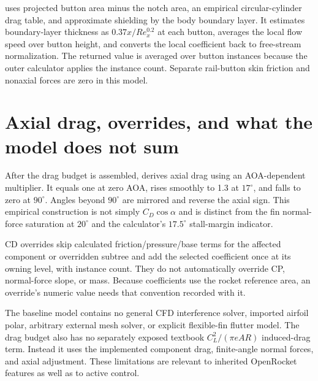  uses projected button area minus the notch area, an empirical circular-cylinder drag table, and approximate shielding by the body boundary layer. It estimates boundary-layer thickness as $0.37x/Re_x^{0.2}$ at each button, averages the local flow speed over button height, and converts the local coefficient back to free-stream normalization. The returned value is averaged over button instances because the outer calculator applies the instance count. Separate rail-button skin friction and nonaxial forces are zero in this model.


\section{Axial drag, overrides, and what the model does not sum}
After the drag budget is assembled,  derives axial drag using an AOA-dependent multiplier. It equals one at zero AOA, rises smoothly to 1.3 at $17^\circ$, and falls to zero at $90^\circ$. Angles beyond $90^\circ$ are mirrored and reverse the axial sign. This empirical construction is not simply $C_D\cos\alpha$ and is distinct from the fin normal-force saturation at $20^\circ$ and the calculator's $17.5^\circ$ stall-margin indicator.

CD overrides skip calculated friction/pressure/base terms for the affected component or overridden subtree and add the selected coefficient once at its owning level, with instance count. They do not automatically override CP, normal-force slope, or mass. Because coefficients use the rocket reference area, an override's numeric value needs that convention recorded with it.

The baseline model contains no general CFD interference solver, imported airfoil polar, arbitrary external mesh solver, or explicit flexible-fin flutter model. The drag budget also has no separately exposed textbook $C_L^2/(\pi eAR)$ induced-drag term. Instead it uses the implemented component drag, finite-angle normal forces, and axial adjustment. These limitations are relevant to inherited OpenRocket features as well as to active control.
